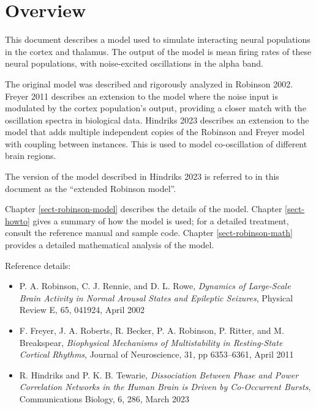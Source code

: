 
\chapter{Overview}
\label{sect-over}

This document describes a model used to simulate interacting neural
populations in the cortex and thalamus. The output of the model is mean
firing rates of these neural populations, with noise-excited oscillations
in the alpha band.

The original model was described and rigorously analyzed in Robinson 2002.
Freyer 2011 describes an extension to the model where the noise input is
modulated by the cortex population's output, providing a closer match with
the oscillation spectra in biological data. Hindriks 2023 describes an
extension to the model that adds multiple independent copies of the
Robinson and Freyer model with coupling between instances. This is used
to model co-oscillation of different brain regions.

The version of the model described in Hindriks 2023 is referred to in this
document as the ``extended Robinson model''.

Chapter \ref{sect-robinson-model} describes the details of the model.
Chapter \ref{sect-howto} gives a summary of how the model is used; for
a detailed treatment, consult the reference manual and sample code.
Chapter \ref{sect-robinson-math} provides a detailed mathematical analysis
of the model.

Reference details:

\begin{itemize}
%
\item P. A. Robinson, C. J. Rennie, and D. L. Rowe, \textit{Dynamics of
Large-Scale Brain Activity in Normal Arousal States and Epileptic Seizures},
Physical Review E, 65, 041924, April 2002
%
\item F. Freyer, J. A. Roberts, R. Becker, P. A. Robinson, P. Ritter, and
M. Breakspear, \textit{Biophysical Mechanisms of Multistability in
Resting-State Cortical Rhythms}, Journal of Neuroscience, 31,
pp 6353--6361, April 2011
%
\item R. Hindriks and P. K. B. Tewarie, \textit{Dissociation Between Phase
and Power Correlation Networks in the Human Brain is Driven by Co-Occurrent
Bursts}, Communications Biology, 6, 286, March 2023
%
\end{itemize}

%
